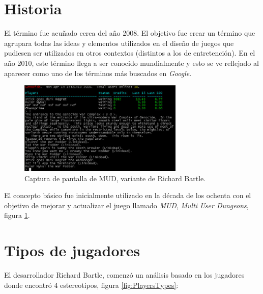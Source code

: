 \section{Historia}

El término {\gam} fue acuñado cerca del año 2008\cite{DefineGamefication}.
El objetivo fue crear un término que agrupara todas las ideas y elementos
utilizados en el diseño de juegos que pudiesen ser utilizados en otros contextos
(distintos a los de entretención).
En el año 2010, este término llega a ser conocido mundialmente  y esto se ve reflejado
 al aparecer como uno de los términos más buscados en \emph{Google}\cite{GamWorks}.

\begin{figure}[!htb]
  \centering
  \includegraphics[width=0.7\textwidth]{images/mud_SS_2.jpg}
  \caption[Captura de pantalla de juego MUD]{Captura de pantalla de MUD,
  variante de Richard Bartle.}
  \label{fig:MudClient}
\end{figure}

El concepto básico fue inicialmente utilizado en la década de los ochenta con el
objetivo de mejorar y actualizar el juego llamado \emph{MUD}, \emph{Multi User Dungeons}, 
figura \ref{fig:MudClient}.

\section{Tipos de jugadores}

El desarrollador Richard Bartle, comenzó un análisis basado en los jugadores
donde encontró 4 estereotipos, figura \ref{fig:PlayersTypes}:

